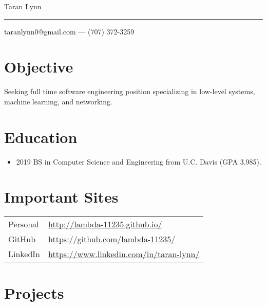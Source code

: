 \documentclass{article}
\begin{document}
\begin{center}
    {\Huge Taran Lynn}\\
    \vspace{0.25em}
    \hrule
    \vspace{0.25em}
    taranlynn0@gmail.com --- (707) 372-3259
\end{center}

\section*{Objective}

Seeking full time software engineering position specializing in low-level
systems, machine learning, and networking.

\section*{Education}

\begin{itemize}
    \item 2019 BS in Computer Science and Engineering from U.C. Davis
        (GPA 3.985).
\end{itemize}

\section*{Important Sites}

\begin{tabular}{ll}
    Personal & \url{http://lambda-11235.github.io/}\\
    GitHub & \url{https://github.com/lambda-11235/}\\
    LinkedIn & \url{https://www.linkedin.com/in/taran-lynn/}\\
\end{tabular}


\section*{Projects}
\end{document}
